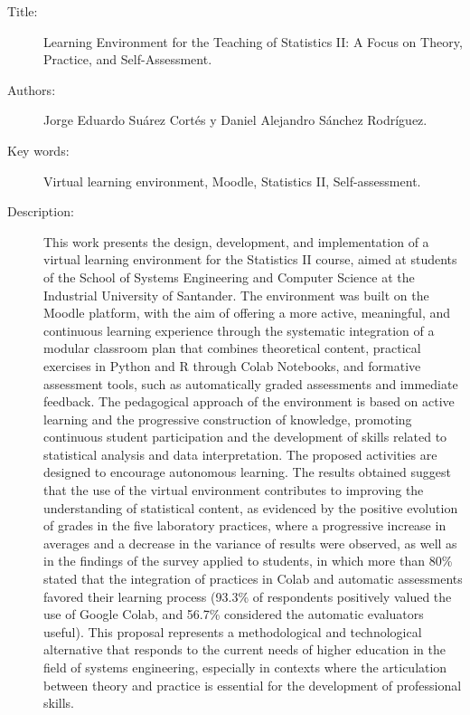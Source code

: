 \documentclass[letter,oneside,12pt,spanish]{report}
\begin{document}
\footnotesize{
\begin{description}
  \item[Title:] Learning Environment for the Teaching of Statistics II: A Focus on Theory, Practice, and Self-Assessment.
  \item[Authors:] Jorge Eduardo Suárez Cortés y Daniel Alejandro Sánchez Rodríguez.
  \item[Key words:] Virtual learning environment, Moodle, Statistics II, Self-assessment.
  \item[Description:] {
    \begin{spacing}{1.8}
	This work presents the design, development, and implementation of a virtual learning environment for the Statistics II course, aimed at students of the School of Systems Engineering and Computer Science at the Industrial University of Santander. The environment was built on the Moodle platform, with the aim of offering a more active, meaningful, and continuous learning experience through the systematic integration of a modular classroom plan that combines theoretical content, practical exercises in Python and R through Colab Notebooks, and formative assessment tools, such as automatically graded assessments and immediate feedback.  
	The pedagogical approach of the environment is based on active learning and the progressive construction of knowledge, promoting continuous student participation and the development of skills related to statistical analysis and data interpretation. The proposed activities are designed to encourage autonomous learning. The results obtained suggest that the use of the virtual environment contributes to improving the understanding of statistical content, as evidenced by the positive evolution of grades in the five laboratory practices, where a progressive increase in averages and a decrease in the variance of results were observed, as well as in the findings of the survey applied to students, in which more than 80\% stated that the integration of practices in Colab and automatic assessments favored their learning process (93.3\% of respondents positively valued the use of Google Colab, and 56.7\% considered the automatic evaluators useful).  
    This proposal represents a methodological and technological alternative that responds to the current needs of higher education in the field of systems engineering, especially in contexts where the articulation between theory and practice is essential for the development of professional skills.
	\end{spacing}
  }
\end{description}}\normalsize
\end{document}

